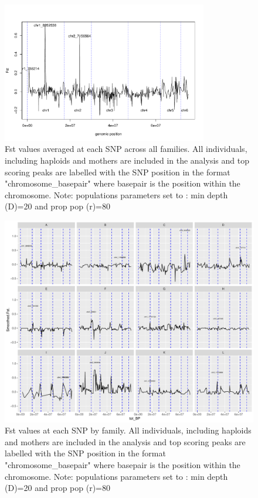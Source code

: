 \documentclass[10pt,a4paper]{report}
\begin{document}
\begin{figure}[h]
	\begin{center}
		\includegraphics[width=0.8\textwidth]{M-F_Fst/haplo_avg_all_Fst.pdf}
		\caption{Fst values averaged at each SNP across all families. All individuals, including haploids and mothers are included in the analysis and top scoring peaks are labelled with the SNP position in the format "chromosome\_basepair" where basepair is the position within the chromosome. Note: populations parameters set to : min depth (D)=20 and prop pop (r)=80}
		\label{haplo_Fst_avg}
	\end{center}
\end{figure}

\begin{figure}[h]
	\begin{center}
		\includegraphics[width=\textwidth]{M-F_Fst/haplo_Fst_per_fam.pdf}
		\caption{Fst values at each SNP by family. All individuals, including haploids and mothers are included in the analysis and top scoring peaks are labelled with the SNP position in the format "chromosome\_basepair" where basepair is the position within the chromosome. Note: populations parameters set to : min depth (D)=20 and prop pop (r)=80}
		\label{haplo_Fst_per_fam}
	\end{center}
\end{figure}
\FloatBarrier
\end{document}
